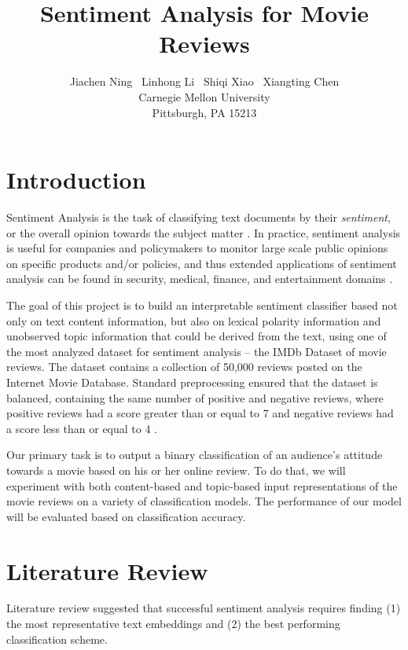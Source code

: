\documentclass{article}
\title{Sentiment Analysis for Movie Reviews}
\author{%
  Jiachen Ning \ Linhong Li \ Shiqi Xiao \ Xiangting Chen \\
  Carnegie Mellon University\\
  Pittsburgh, PA 15213 \\
}
\begin{document}

\maketitle

\section{Introduction}

Sentiment Analysis is the task of classifying text documents by their {\it sentiment}, or the overall opinion towards the subject matter \cite{Pang}. In practice, sentiment analysis is useful for companies and policymakers to monitor large scale public opinions on specific products and/or policies, and thus extended applications of sentiment analysis can be found in security, medical, finance, and entertainment domains \cite{Mantyl}.

The goal of this project is to build an interpretable sentiment classifier based not only on text content information, but also on lexical polarity information and unobserved topic information that could be derived from the text, using one of the most analyzed dataset for sentiment analysis -- the IMDb Dataset of movie reviews. The dataset contains a collection of 50,000 reviews posted on the Internet Movie Database. Standard preprocessing ensured that the dataset is balanced, containing the same number of positive and negative reviews, where positive reviews had a score greater than or equal to 7 and negative reviews had a score less than or equal to 4 \cite{Mass}. 

Our primary task is to output a binary classification of an audience's attitude towards a movie based on his or her online review. To do that, we will experiment with both content-based and topic-based input representations of the movie reviews on a variety of classification models. The performance of our model will be evaluated based on classification accuracy.



\section{Literature Review}

Literature review suggested that successful sentiment analysis requires finding (1) the most representative text embeddings and (2) the best performing classification scheme. 
\end{document}
